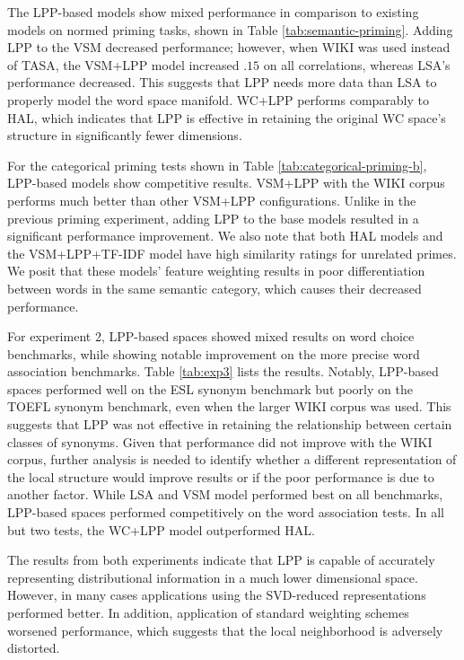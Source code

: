 \documentclass[11pt]{article}
\begin{document}
The LPP-based models show mixed performance in comparison to existing models on
normed priming tasks, shown in Table \ref{tab:semantic-priming}.  Adding LPP to
the VSM decreased performance; however, when WIKI was used instead of TASA, the
VSM+LPP model increased $.15$ on all correlations, whereas LSA's performance decreased.
This suggests that LPP needs more data than LSA to properly model the word space
manifold.
%
WC+LPP performs comparably to HAL, which indicates that LPP is effective in
retaining the original WC space's structure in significantly fewer dimensions.

For the categorical priming tests shown in Table
\ref{tab:categorical-priming-b}, LPP-based models show competitive results.
VSM+LPP with the WIKI corpus performs much better than other VSM+LPP
configurations.  Unlike in the previous priming experiment, adding LPP to the
base models resulted in a significant performance improvement.
%
We also note that both HAL models and the VSM+LPP+TF-IDF model have high
similarity ratings for unrelated primes.  We posit that these models' feature
weighting results in poor differentiation between words in the same semantic
category, which causes their decreased performance.

For experiment 2, LPP-based spaces showed mixed results on word choice
benchmarks, while showing notable improvement on the more precise word
association benchmarks. Table \ref{tab:exp3} lists the results.  Notably,
LPP-based spaces performed well on the ESL synonym benchmark but poorly on the
TOEFL synonym benchmark, even when the larger WIKI corpus was used.  This
suggests that LPP was not effective in retaining the relationship between
certain classes of synonyms.  Given that performance did not improve with the
WIKI corpus, further analysis is needed to identify whether a different
representation of the local structure would improve results or if the poor
performance is due to another factor.  While LSA and VSM model performed best on
all benchmarks, LPP-based spaces performed competitively on the word association
tests.  In all but two tests, the WC+LPP model outperformed HAL.

The results from both experiments indicate that LPP is capable of accurately
representing distributional information in a much lower dimensional space.
However, in many cases applications using the SVD-reduced representations
performed better.  In addition, application of standard weighting schemes
worsened performance, which suggests that the local neighborhood is adversely
distorted.
\end{document}
